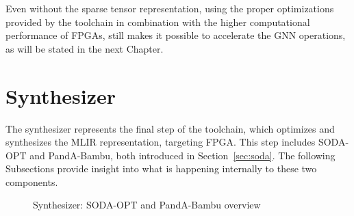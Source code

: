 Even without the sparse tensor representation, using the proper optimizations provided by the toolchain in combination with the higher computational performance of FPGAs, still makes it possible to accelerate the GNN operations, as will be stated in the next Chapter.

\section{Synthesizer}
\label{sec:toolchain-synthesizer}%

The synthesizer represents the final step of the toolchain, which optimizes and synthesizes the MLIR representation, targeting FPGA\@.
This step includes SODA-OPT and PandA-Bambu, both introduced in Section~\ref{sec:soda}.
The following Subsections provide insight into what is happening internally to these two components.

\begin{figure}[t]
    \centering
    \hspace{0.03\textwidth}
    \caption{Synthesizer: SODA-OPT and PandA-Bambu overview~\cite{9786533}}
    \label{fig:synthesizer_flow}
\end{figure}

